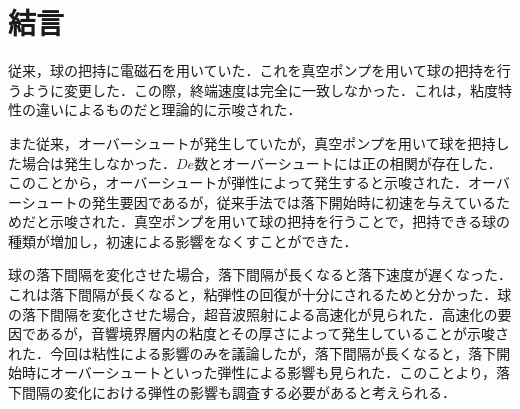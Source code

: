 \clearpage
\section{結言}

従来，球の把持に電磁石を用いていた．これを真空ポンプを用いて球の把持を行うように変更した．この際，終端速度は完全に一致しなかった．これは，粘度特性の違いによるものだと理論的に示唆された．

また従来，オーバーシュートが発生していたが，真空ポンプを用いて球を把持した場合は発生しなかった．$De$数とオーバーシュートには正の相関が存在した．このことから，オーバーシュートが弾性によって発生すると示唆された．オーバーシュートの発生要因であるが，従来手法では落下開始時に初速を与えているためだと示唆された．真空ポンプを用いて球の把持を行うことで，把持できる球の種類が増加し，初速による影響をなくすことができた．

球の落下間隔を変化させた場合，落下間隔が長くなると落下速度が遅くなった．これは落下間隔が長くなると，粘弾性の回復が十分にされるためと分かった．球の落下間隔を変化させた場合，超音波照射による高速化が見られた．高速化の要因であるが，音響境界層内の粘度とその厚さによって発生していることが示唆された．今回は粘性による影響のみを議論したが，落下間隔が長くなると，落下開始時にオーバーシュートといった弾性による影響も見られた．このことより，落下間隔の変化における弾性の影響も調査する必要があると考えられる．

